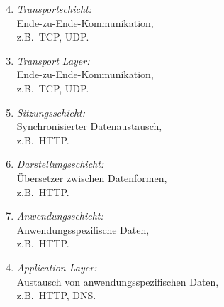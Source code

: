 \documentclass[a4paper,parskip=half*,DIV=15,fontsize=11pt]{scrartcl}
\newlength{\currentparskip}
\newenvironment{minipageparskip}
  {\setlength{\currentparskip}{\parskip} %
   \begin{minipage}{\textwidth} %
   \setlength{\parskip}{\currentparskip} %
  }
  {\end{minipage}}
\begin{document}
\begin{minipageparskip}
\begin{minipage}{0.45\textwidth}
\begin{enumerate}
    \setcounter{enumi}{3}
    \item \emph{Transportschicht:}\\ Ende-zu-Ende-Kommunikation,\\ z.B.\ TCP, UDP.
\end{enumerate}
\end{minipage}\hspace{0.05\textwidth}
\begin{minipage}{0.45\textwidth}
\begin{enumerate}
    \setcounter{enumi}{2}
    \item \emph{Transport Layer:}\\ Ende-zu-Ende-Kommunikation,\\ z.B.\ TCP, UDP.
\end{enumerate}
\end{minipage}

\begin{minipage}{0.45\textwidth}
\begin{enumerate}[nolistsep]
    \setcounter{enumi}{4}
    \item \emph{Sitzungsschicht:}\\ Synchronisierter Datenaustausch,\\ z.B.\ HTTP.
    \item \emph{Darstellungsschicht:}\\ Übersetzer zwischen Datenformen,\\ z.B.\ HTTP.
    \item \emph{Anwendungsschicht:}\\ Anwendungsspezifische Daten,\\ z.B.\ HTTP.
\end{enumerate}
\end{minipage}\hspace{0.05\textwidth}
\begin{minipage}{0.45\textwidth}
\centering
\begin{enumerate}
    \setcounter{enumi}{3}
    \item \emph{Application Layer:}\\ Austausch von anwendungsspezifischen Daten,\\ z.B.\ HTTP, DNS.
\end{enumerate}
\end{minipage}
\end{minipageparskip}
\end{document}
